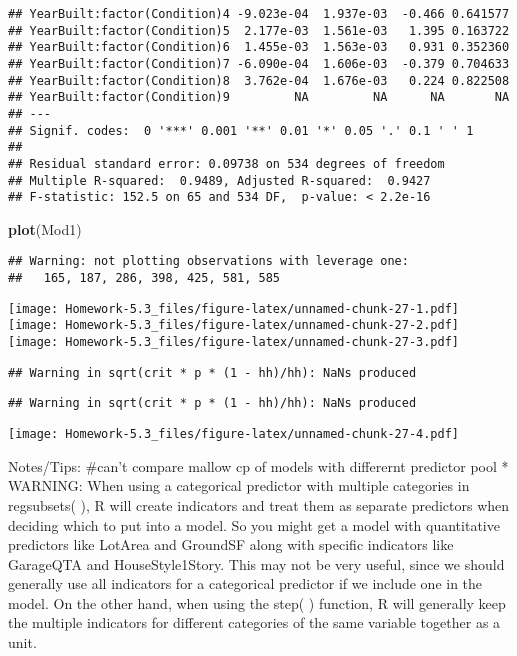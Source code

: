 \documentclass[
]{article}
\newenvironment{Shaded}{\begin{snugshade}}{\end{snugshade}}
\newcommand{\KeywordTok}[1]{\textcolor[rgb]{0.13,0.29,0.53}{\textbf{#1}}}
\newcommand{\NormalTok}[1]{#1}
\begin{document}
\begin{verbatim}
## YearBuilt:factor(Condition)4 -9.023e-04  1.937e-03  -0.466 0.641577    
## YearBuilt:factor(Condition)5  2.177e-03  1.561e-03   1.395 0.163722    
## YearBuilt:factor(Condition)6  1.455e-03  1.563e-03   0.931 0.352360    
## YearBuilt:factor(Condition)7 -6.090e-04  1.606e-03  -0.379 0.704633    
## YearBuilt:factor(Condition)8  3.762e-04  1.676e-03   0.224 0.822508    
## YearBuilt:factor(Condition)9         NA         NA      NA       NA    
## ---
## Signif. codes:  0 '***' 0.001 '**' 0.01 '*' 0.05 '.' 0.1 ' ' 1
## 
## Residual standard error: 0.09738 on 534 degrees of freedom
## Multiple R-squared:  0.9489, Adjusted R-squared:  0.9427 
## F-statistic: 152.5 on 65 and 534 DF,  p-value: < 2.2e-16
\end{verbatim}

\begin{Shaded}
\begin{Highlighting}[]
\KeywordTok{plot}\NormalTok{(Mod1)}
\end{Highlighting}
\end{Shaded}

\begin{verbatim}
## Warning: not plotting observations with leverage one:
##   165, 187, 286, 398, 425, 581, 585
\end{verbatim}

\texttt{[image: Homework-5.3\_files/figure-latex/unnamed-chunk-27-1.pdf]}
\texttt{[image: Homework-5.3\_files/figure-latex/unnamed-chunk-27-2.pdf]}
\texttt{[image: Homework-5.3\_files/figure-latex/unnamed-chunk-27-3.pdf]}

\begin{verbatim}
## Warning in sqrt(crit * p * (1 - hh)/hh): NaNs produced
\end{verbatim}

\begin{verbatim}
## Warning in sqrt(crit * p * (1 - hh)/hh): NaNs produced
\end{verbatim}

\texttt{[image: Homework-5.3\_files/figure-latex/unnamed-chunk-27-4.pdf]}

Notes/Tips: \#can't compare mallow cp of models with differernt
predictor pool * WARNING: When using a categorical predictor with
multiple categories in regsubsets( ), R will create indicators and treat
them as separate predictors when deciding which to put into a model. So
you might get a model with quantitative predictors like LotArea and
GroundSF along with specific indicators like GarageQTA and
HouseStyle1Story. This may not be very useful, since we should generally
use all indicators for a categorical predictor if we include one in the
model. On the other hand, when using the step( ) function, R will
generally keep the multiple indicators for different categories of the
same variable together as a unit.
\end{document}
